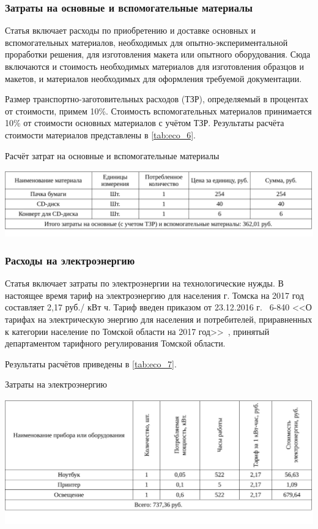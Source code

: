 \subsubsection{Затраты на основные и вспомогательные материалы}

Статья включает расходы по приобретению и доставке основных и вспомогательных материалов, необходимых для опытно-экспериментальной проработки 
решения, для изготовления макета или опытного оборудования. Сюда включаются и стоимость необходимых материалов для изготовления образцов и 
макетов, и материалов необходимых для оформления требуемой документации.

Размер транспортно-заготовительных расходов (ТЗР), определяемый в процентах от стоимости, примем 10\%. 
Стоимость вспомогательных материалов принимается 10\% от стоимости основных материалов с учётом ТЗР. 
Результаты расчёта стоимости материалов представлены в \ref{tab:eco_6}.

\begin{table}[!ht]
\caption{Расчёт затрат на основные и вспомогательные материалы}
\centering
\includegraphics[page=1, width=1\linewidth]{tables/economics/econom.pdf}
\label{tab:eco_6}
\end{table}


\subsubsection{Расходы на электроэнергию}

Статья включает затраты по электроэнергии на технологические нужды. В настоящее время тариф на электроэнергию для населения г. Томска на 2017 год составляет 2,17 руб./ кВт ч. Тариф введен 
приказом от 23.12.2016 г. \textnumero~6-840 <<О тарифах на электрическую энергию для населения и 
потребителей, приравненных к категории население по Томской области на 2017 год>>~\cite{electr}, 
принятый департаментом тарифного регулирования Томской области.

Результаты расчётов приведены в \ref{tab:eco_7}.

\begin{table}[!ht]
\caption{Затраты на электроэнергию}
\centering
\includegraphics[page=1, width=1\linewidth]{tables/economics/econom_2.pdf}
\label{tab:eco_7}
\end{table}


